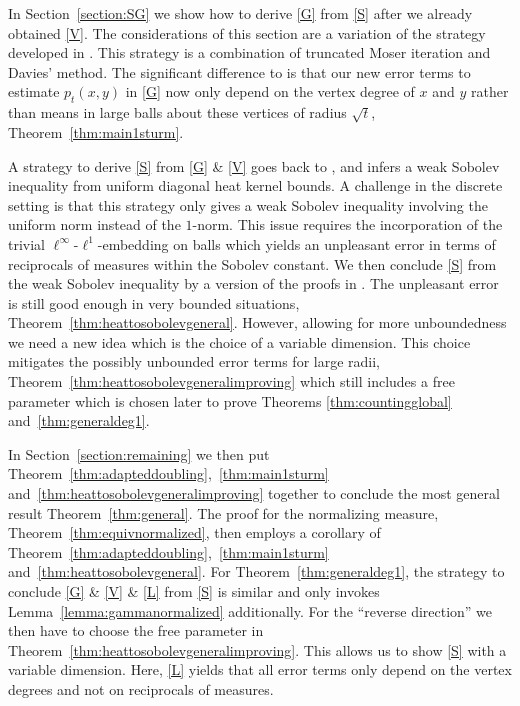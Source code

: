 \documentclass[10pt]{amsart}
\theoremstyle{plain}
\theoremstyle{definition}
\begin{document}
In Section~\ref{section:SG} we show how to derive \eqref{G} from \eqref{S} after we already obtained \eqref{V}. The considerations of this section are a variation of the strategy developed in \cite{KellerRose-22a}. This strategy is a combination of truncated Moser iteration and Davies' method. The significant difference to \cite{KellerRose-22a} is that our new error terms to estimate $ p_{t}(x,y) $ in \eqref{G} now only depend on the vertex degree of $ x $ and $ y $ rather than means in large balls about these vertices of radius $ \sqrt{t} $, \cf Theorem~\ref{thm:main1sturm}.

A strategy to derive \eqref{S} from \eqref{G} \& \eqref{V} goes back to \cite{Varopoulos-85}, \cf \cite{SaloffC-01} and infers a weak Sobolev inequality from uniform diagonal heat kernel bounds. A challenge in the discrete setting is that this strategy only gives a weak Sobolev inequality involving the uniform norm instead of the $ 1 $-norm.
This issue requires the incorporation of the trivial $\ell^\infty$-$\ell^1$-embedding on balls which yields an unpleasant error in terms of reciprocals of measures within the Sobolev constant. We then conclude \eqref{S} from the weak Sobolev inequality by a version of the proofs in \cite{Barlow-book, Delmotte-97}. The unpleasant error is still good enough in very bounded situations, \cf Theorem~\ref{thm:heattosobolevgeneral}. However, allowing for more unboundedness we need a new idea which is the choice of a variable dimension. This choice mitigates the possibly unbounded error terms for large radii, \cf Theorem~\ref{thm:heattosobolevgeneralimproving} which still includes a free parameter which is chosen later to prove Theorems \ref{thm:countingglobal} and~\ref{thm:generaldeg1}.

In Section~\ref{section:remaining} we then put Theorem~\ref{thm:adapteddoubling},~\ref{thm:main1sturm} and~\ref{thm:heattosobolevgeneralimproving} together to conclude the most general result Theorem~\ref{thm:general}. The proof for the normalizing measure, Theorem~\ref{thm:equivnormalized}, then employs a corollary of Theorem~\ref{thm:adapteddoubling},~\ref{thm:main1sturm} and~\ref{thm:heattosobolevgeneral}. For Theorem~\ref{thm:generaldeg1}, the strategy to conclude \eqref{G} \& \eqref{V} \& \eqref{L}
from \eqref{S} is similar and only invokes Lemma~\ref{lemma:gammanormalized} additionally. For the ``reverse direction'' we then have to choose the free parameter in Theorem~\ref{thm:heattosobolevgeneralimproving}. This allows us to show \eqref{S} with a variable dimension. Here, \eqref{L} yields that all error terms only depend on the vertex degrees and not on reciprocals of measures.
\end{document}
